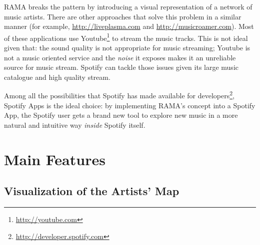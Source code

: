 \documentclass{article}
\begin{document}
  RAMA breaks the pattern by introducing a visual representation of a network of music artists.
  There are other approaches that solve this problem in a similar manner (for example, \url{http://liveplasma.com} and \url{http://musicroamer.com}).
  Most of these applications use Youtube\footnote{\url{http://youtube.com}} to stream the music tracks.
  This is not ideal given that: the sound quality is not appropriate for music streaming; Youtube is not a music oriented service and the \emph{noise} it exposes makes it an unreliable source for music stream.
  Spotify can tackle those issues given its large music catalogue and high quality stream.

  Among all the possibilities that Spotify has made available for developers\footnote{\url{http://developer.spotify.com}}, Spotify Apps is the ideal choice: by implementing RAMA's concept into a Spotify App, the Spotify user gets a brand new tool to explore new music in a more natural and intuitive way \emph{inside} Spotify itself.

  \section{Main Features} %
  \label{sec:features}
  
    \subsection{Visualization of the Artists' Map} %
    \label{sub:visualization}
\end{document}
